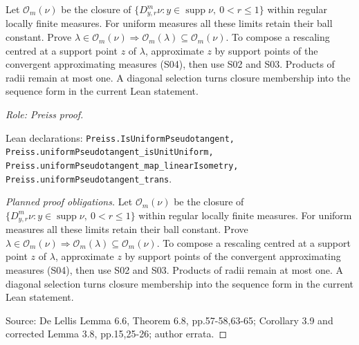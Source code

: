 \begin{lemma}
\label{lem:pseudotangent-transitive}






Let $\mathcal O_m(\nu)$ be the closure of
$\{D^m_{y,r}\nu:y\in\operatorname{supp}\nu,\ 0<r\leq1\}$ within regular
locally finite measures. For uniform measures all these limits retain their
ball constant. Prove
$\lambda\in\mathcal O_m(\nu)\Rightarrow
 \mathcal O_m(\lambda)\subseteq\mathcal O_m(\nu)$.
To compose a rescaling centred at a support point $z$ of $\lambda$, approximate
$z$ by support points of the convergent approximating measures (S04), then use
S02 and S03. Products of radii remain at most one. A diagonal selection turns
closure membership into the sequence form in the current Lean statement.
\par\emph{Role: Preiss proof.}
\par Lean declarations: \texttt{Preiss.IsUniformPseudotangent, Preiss.uniformPseudotangent\_isUnitUniform, Preiss.uniformPseudotangent\_map\_linearIsometry, Preiss.uniformPseudotangent\_trans}.
\end{lemma}
\begin{proof}[Planned proof obligations]

Let $\mathcal O_m(\nu)$ be the closure of
$\{D^m_{y,r}\nu:y\in\operatorname{supp}\nu,\ 0<r\leq1\}$ within regular
locally finite measures. For uniform measures all these limits retain their
ball constant. Prove
$\lambda\in\mathcal O_m(\nu)\Rightarrow
 \mathcal O_m(\lambda)\subseteq\mathcal O_m(\nu)$.
To compose a rescaling centred at a support point $z$ of $\lambda$, approximate
$z$ by support points of the convergent approximating measures (S04), then use
S02 and S03. Products of radii remain at most one. A diagonal selection turns
closure membership into the sequence form in the current Lean statement.
\par Source: De Lellis Lemma 6.6, Theorem 6.8, pp.57-58,63-65; Corollary 3.9 and corrected Lemma 3.8, pp.15,25-26; author errata.
\end{proof}

